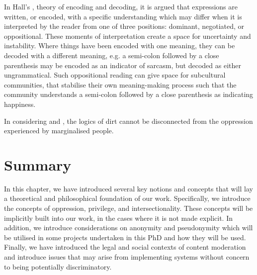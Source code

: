 {In Hall's \citeyear{Hall:1997}, theory of encoding and decoding, it is argued that expressions are written, or encoded, with a specific understanding which may differ when it is interpreted by the reader from one of three positions: dominant, negotiated, or oppositional. These moments of interpretation create a space for uncertainty and instability. Where things have been encoded with one meaning, they can be decoded with a different meaning, e.g. a semi-colon followed by a close parenthesis may be encoded as an indicator of sarcasm, but decoded as either ungrammatical. Such oppositional reading can give space for subcultural communities, that stabilise their own meaning-making process such that the community understands a semi-colon followed by a close parenthesis as indicating happiness.

In considering \cite{Hall:1997} and \cite{Lepawsky:2019}, the logics of dirt cannot be disconnected from the oppression experienced by marginalised people.

\cite{Roberts:2019}
} %


\section{Summary}
In this chapter, we have introduced several key notions and concepts that will lay a theoretical and philosophical foundation of our work. Specifically, we introduce the concepts of oppression, privilege, and intersectionality. These concepts will be implicitly built into our work, in the cases where it is not made explicit. In addition, we introduce considerations on anonymity and pseudonymity which will be utilised in some projects undertaken in this PhD and how they will be used. Finally, we have introduced the legal and social contexts of content moderation and introduce issues that may arise from implementing systems without concern to being potentially discriminatory.

